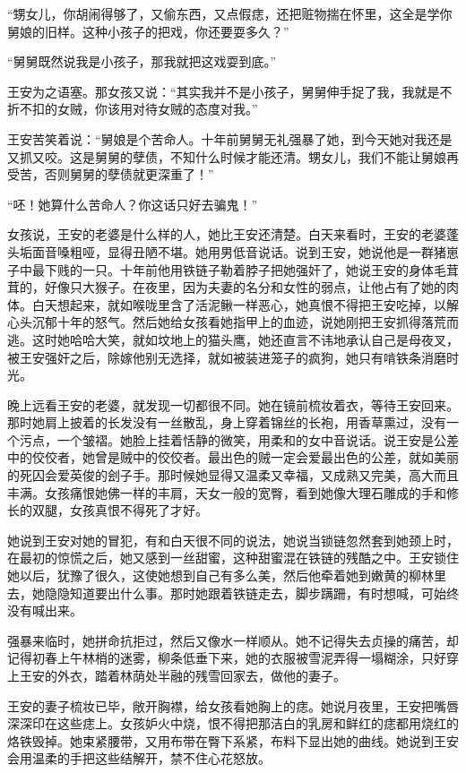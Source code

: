 “甥女儿，你胡闹得够了，又偷东西，又点假痣，还把赃物揣在怀里，这全是学你舅娘的旧样。这种小孩子的把戏，你还要耍多久？” 

“舅舅既然说我是小孩子，那我就把这戏耍到底。” 

王安为之语塞。那女孩又说：“其实我并不是小孩子，舅舅伸手捉了我，我就是不折不扣的女贼，你该用对待女贼的态度对我。” 

王安苦笑着说：“舅娘是个苦命人。十年前舅舅无礼强暴了她，到今天她对我还是又抓又咬。这是舅舅的孽债，不知什么时候才能还清。甥女儿，我们不能让舅娘再受苦，否则舅舅的孽债就更深重了！” 

“呸！她算什么苦命人？你这话只好去骗鬼！” 

女孩说，王安的老婆是什么样的人，她比王安还清楚。白天来看时，王安的老婆蓬头垢面音嗓粗哑，显得丑陋不堪。她用男低音说话。说到王安，她说他是一群猪崽子中最下贱的一只。十年前他用铁链子勒着脖子把她强奸了，她说王安的身体毛茸茸的，好像只大猴子。在夜里，因为夫妻的名分和女性的弱点，让他占有了她的肉体。白天想起来，就如喉咙里含了活泥鳅一样恶心，她真恨不得把王安吃掉，以解心头沉郁十年的怒气。然后她给女孩看她指甲上的血迹，说她刚把王安抓得落荒而逃。这时她哈哈大笑，就如坟地上的猫头鹰，她还直言不讳地承认自己是母夜叉，被王安强奸之后，除嫁他别无选择，就如被装进笼子的疯狗，她只有啃铁条消磨时光。 

晚上远看王安的老婆，就发现一切都很不同。她在镜前梳妆着衣，等待王安回来。那时她肩上披着的长发没有一丝散乱，身上穿着锦丝的长袍，用香草熏过，没有一个污点，一个皱褶。她脸上挂着恬静的微笑，用柔和的女中音说话。说王安是公差中的佼佼者，她曾是贼中的佼佼者。最出色的贼一定会爱最出色的公差，就如美丽的死囚会爱英俊的刽子手。那时候她显得又温柔又幸福，又成熟又完美，高大而且丰满。女孩痛恨她佛一样的丰肩，天女一般的宽臀，看到她像大理石雕成的手和修长的双腿，女孩真恨不得死了才好。 

她说到王安对她的冒犯，有和白天很不同的说法，她说当锁链忽然套到她颈上时，在最初的惊慌之后，她又感到一丝甜蜜，这种甜蜜混在铁链的残酷之中。王安锁住她以后，犹豫了很久，这使她想到自己有多么美，然后他牵着她到嫩黄的柳林里去，她隐隐知道要出什么事。那时她跟着铁链走去，脚步蹒跚，有时想喊，可始终没有喊出来。 

强暴来临时，她拼命抗拒过，然后又像水一样顺从。她不记得失去贞操的痛苦，却记得初春上午林梢的迷雾，柳条低垂下来，她的衣服被雪泥弄得一塌糊涂，只好穿上王安的外衣，踏着林荫处半融的残雪回家去，做他的妻子。 

王安的妻子梳妆已毕，敞开胸襟，给女孩看她胸上的痣。她说月夜里，王安把嘴唇深深印在这些痣上。女孩妒火中烧，恨不得把那洁白的乳房和鲜红的痣都用烧红的烙铁毁掉。她束紧腰带，又用布带在臀下系紧，布料下显出她的曲线。她说到王安会用温柔的手把这些结解开，禁不住心花怒放。 

